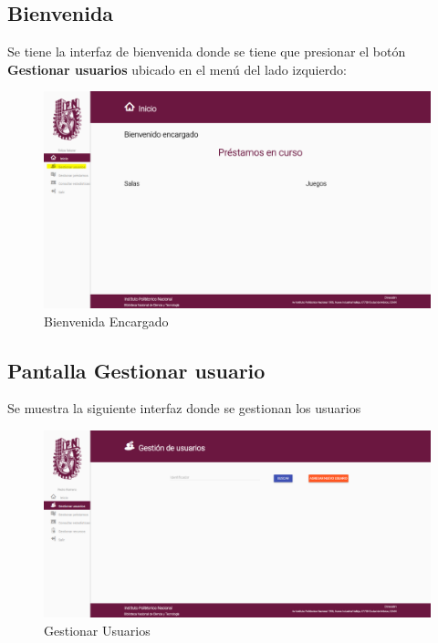 \subsection{Bienvenida}

Se tiene la interfaz de bienvenida donde se tiene que presionar el botón  \textbf{Gestionar usuarios} ubicado en el menú del lado izquierdo:
	\begin{figure}[hbtp]
		\centering
		\includegraphics[scale=0.3]{images/Interfaz/IUGS22_binevenidaEncargado.png}
		\caption{Bienvenida Encargado}
	\end{figure}
\subsection{Pantalla Gestionar usuario}
Se muestra la siguiente interfaz donde se gestionan los usuarios

	\begin{figure}[hbtp]
		\centering
		\includegraphics[scale=0.3]{images/Interfaz/IUGS22_gestionarUsuario.png}
		\caption{Gestionar Usuarios}
	\end{figure}